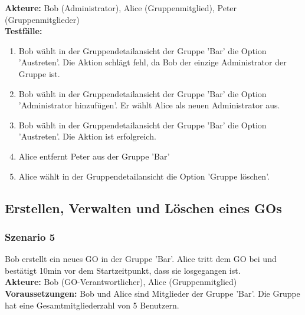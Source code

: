 \documentclass[parskip=full]{scrartcl}
\def\threedigits#1{%
  \ifnum#1<100 0\fi
  \ifnum#1<10 0\fi
  \number#1}
\begin{document}
\textbf{Akteure:} Bob (Administrator), Alice (Gruppenmitglied), Peter (Gruppenmitglieder) \\

\textbf{Testfälle:}
\begin{enumerate}[label={\textbf{/T\protect\threedigits{\theenumi}0/}}, leftmargin=*, resume]
	\item Bob wählt in der Gruppendetailansicht der Gruppe 'Bar' die Option 'Austreten'. Die Aktion schlägt fehl, da Bob der einzige Administrator der Gruppe ist.
	\item Bob wählt in der Gruppendetailansicht der Gruppe 'Bar' die Option 'Administrator hinzufügen'. Er wählt Alice als neuen Administrator aus.
	\item Bob wählt in der Gruppendetailansicht der Gruppe 'Bar' die Option 'Austreten'. Die Aktion ist erfolgreich.
	\item Alice entfernt Peter aus der Gruppe 'Bar'
	\item Alice wählt in der Gruppendetailansicht die Option 'Gruppe löschen'.
\end{enumerate}

\subsection{Erstellen, Verwalten und Löschen eines GOs}

\subsubsection*{Szenario 5}Bob erstellt ein neues GO in der Gruppe 'Bar'. Alice tritt dem GO bei und bestätigt 10min vor dem Startzeitpunkt, dass sie losgegangen ist.\\

\textbf{Akteure:} Bob (GO-Verantwortlicher), Alice (Gruppenmitglied)\\

\textbf{Voraussetzungen: }Bob und Alice sind Mitglieder der Gruppe 'Bar'. Die Gruppe hat eine Gesamtmitgliederzahl von 5 Benutzern.
\end{document}
